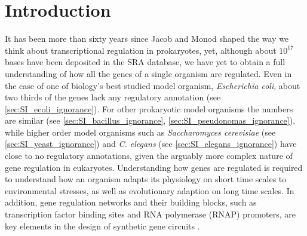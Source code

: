 \section{Introduction}
It has been more than sixty years since Jacob and Monod \cite{jacob1961genetic} shaped the way we think about transcriptional regulation in prokaryotes, yet, although about $10^{17}$ bases have been deposited in the SRA database\cite{sragrowth}, we have yet to obtain a full understanding of how all the genes of a single organism are regulated. Even in the case of one of biology's best studied model organism, \textit{Escherichia coli}, about two thirds of the genes lack any regulatory annotation (see \ref{sec:SI_ecoli_ignorance}). For other prokaryotic model organisms the numbers are similar (see \ref{sec:SI_bacillus_ignorance}, \ref{sec:SI_pseudonomas_ignorance}), while higher order model organisms such as \textit{Saccharomyces cerevisiae} (see \ref{sec:SI_yeast_ignorance}) and \textit{C. elegans} (see \ref{sec:SI_elegans_ignorance}) have close to no regulatory annotations, given the arguably more complex nature of gene regulation in eukaryotes. Understanding how genes are regulated is required to understand how an organism adapts its physiology on short time scales to environmental stresses, as well as evolutionary adaption on long time scales. In addition, gene regulation networks and their building blocks, such as transcription factor binding sites and RNA polymerase (RNAP) promoters, are key elements in the design of synthetic gene circuits \cite{elowitz2000synthetic, mangan2003structure, alon2006introduction}.

